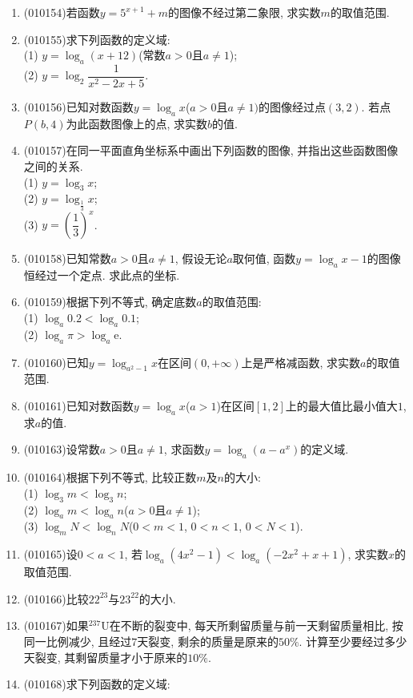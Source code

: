 \documentclass[10pt,a4paper]{article}
\begin{document}
\begin{enumerate}[1.]
\item {\tiny (010154)}若函数$y=5^{x+1}+m$的图像不经过第二象限, 求实数$m$的取值范围.
\item {\tiny (010155)}求下列函数的定义域:\\
(1) $y=\log_a (x+12)$(常数$a>0$且$a\ne 1$);\\
(2) $y=\log_2\dfrac1{x^2-2x+5}$.
\item {\tiny (010156)}已知对数函数$y=\log_ax$($a>0$且$a\ne 1)$的图像经过点$(3, 2)$. 若点$P(b, 4)$为此函数图像上的点, 求实数$b$的值.
\item {\tiny (010157)}在同一平面直角坐标系中画出下列函数的图像, 并指出这些函数图像之间的关系.\\
(1) $y=\log_3x$;\\
(2) $y=\log_{\frac 13}x$;\\
(3) $y=(\dfrac 13)^x$.
\item {\tiny (010158)}已知常数$a>0$且$a\ne 1$, 假设无论$a$取何值, 函数$y=\log_ax-1$的图像恒经过一个定点. 求此点的坐标.
\item {\tiny (010159)}根据下列不等式, 确定底数$a$的取值范围:\\
(1) $\log_a 0.2<\log_a 0.1$;\\
(2) $\log_a\pi >\log_a\mathrm{e}$.
\item {\tiny (010160)}已知$y=\log_{a^2-1}x$在区间$(0, +\infty)$上是严格减函数, 求实数$a$的取值范围.
\item {\tiny (010161)}已知对数函数$y=\log_ax$($a>1$)在区间$[1, 2]$上的最大值比最小值大$1$, 求$a$的值.
\item {\tiny (010163)}设常数$a>0$且$a\ne 1$, 求函数$y=\log_a(a-a^x)$的定义域.
\item {\tiny (010164)}根据下列不等式, 比较正数$m$及$n$的大小:\\
(1) $\log_3m<\log_3n$;\\
(2) $\log_am<\log_an$($a>0$且$a\ne 1$);\\
(3) $\log_mN<\log_nN$($0<m<1$, $0<n<1$, $0<N<1$).
\item {\tiny (010165)}设$0<a<1$, 若$\log_a(4x^2-1)<\log_a(-2x^2+x+1)$, 求实数$x$的取值范围.
\item {\tiny (010166)}比较$22^{23}$与$23^{22}$的大小.
\item {\tiny (010167)}如果$^{237}\text{U}$在不断的裂变中, 每天所剩留质量与前一天剩留质量相比, 按同一比例减少, 且经过$7$天裂变, 剩余的质量是原来的$50\%$. 计算至少要经过多少天裂变, 其剩留质量才小于原来的$10\%$.
\item {\tiny (010168)}求下列函数的定义域:\\

\end{enumerate}
\end{document}
